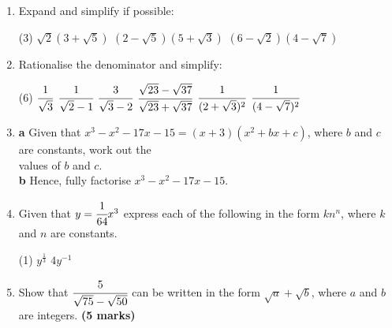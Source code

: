 \documentclass[fleqn, twoside]{article}
\begin{document}
\begin{enumerate}
    \item Expand and simplify if possible:
        \begin{tasks}(3) %
            \task $\sqrt{2}(3+\sqrt{5})$
            \task $(2-\sqrt{5})(5+\sqrt{3})$
            \task $(6-\sqrt{2})(4-\sqrt{7})$
        \end{tasks}
        
    \item Rationalise the denominator and simplify: \vspace{-2mm}
        \begin{tasks}(6) %
            \task $\cfrac{1}{\sqrt{3}}$
            \task $\cfrac{1}{\sqrt{2}-1}$
            \task $\cfrac{3}{\sqrt{3}-2}$
            \task $\cfrac{\sqrt{23}-\sqrt{37}}{\sqrt{23}+\sqrt{37}}$
            \task $\cfrac{1}{(2+\sqrt{3})^2}$
            \task $\cfrac{1}{(4-\sqrt{7})^2}$
        \end{tasks}
        
    \item \hspace*{2mm}\textbf{a}\hspace*{5mm} Given that $x^3-x^2-17x-15=(x+3)(x^2+bx+c)$, where $b$ and $c$ are constants, work out the \\\hspace*{9mm} values of $b$ and $c$.\vspace{1mm}\\
          \hspace*{2mm}\textbf{b}\hspace*{5mm} Hence, fully factorise $x^3-x^2-17x-15$.
    \newpage

    \item Given that $y=\cfrac{1}{64}x^3$ express each of the following in the form $kn^n$, where $k$ and $n$ are constants. \vspace{-2mm}
        \begin{tasks}(1)
            \task $y^{\textstyle\frac{1}{3}}$
            \task $4y^{-1}$
        \end{tasks}
        \vspace{-4mm}
        
    \item Show that $\cfrac{5}{\sqrt{75}-\sqrt{50}}$ can be written in the form $\sqrt{a}+\sqrt{b}$, where $a$ and $b$ are integers. \hfill\textbf{(5 marks)}
    

\end{enumerate}
\end{document}
